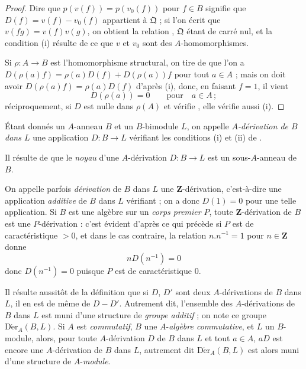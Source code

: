 \begin{proof}
Dire que $p(v(f))=p(v_0(f))$ pour $f\in B$ signifie que
$D(f)=v(f)-v_0(f)$ appartient à $\mathfrak{Q}$ ; si l'on écrit que
$v(fg)=v(f)v(g)$, on obtient la relation ,
$\mathfrak{Q}$ étant de carré nul, et la condition (i) résulte de ce que $v$
et $v_0$ sont des $A$-homomorphismes.

Si $\rho:A\to B$ est l'homomorphisme structural, on tire de
 que l'on a
$D(\rho(a)f)=\rho(a)D(f)+D(\rho(a))f$ pour tout $a\in A$ ; mais on doit
avoir $D(\rho(a)f)=\rho(a)D(f)$ d'après (i), donc, en faisant $f=1$, il
vient
\[
  D(\rho(a))=0 \qquad\text{pour}\quad a\in A\,;
\]
réciproquement, si $D$ est nulle dans $\rho(A)$ et vérifie
, elle vérifie aussi (i).
\end{proof}

\begin{definition}[20.1.2]
\label{0.20.1.2-fr}
Étant donnés un $A$-anneau $B$ et un $B$-bimodule $L$, on appelle
\emph{$A$-dérivation de $B$ dans $L$} une application $D:B\to L$ vérifiant
les conditions (i) et (ii) de .
\end{definition}

Il résulte de  que le \emph{noyau} d'une $A$-dérivation
$D:B\to L$ est un sous-$A$-anneau de $B$.

On appelle parfois \emph{dérivation} de $B$ dans $L$ une
$\mathbf{Z}$-dérivation, c'est-à-dire une application \emph{additive} de $B$
dans $L$ vérifiant  ; on a donc $D(1)=0$ pour une telle
application. Si $B$ est une algèbre sur un \emph{corps premier} $P$, toute
$\mathbf{Z}$-dérivation de $B$ est une $P$-dérivation : c'est évident d'après
ce qui précède si $P$ est de caractéristique $>0$, et dans le cas contraire,
la relation $n.n^{-1}=1$ pour $n\in\mathbf{Z}$ donne
\[
  nD(n^{-1})=0
\]
donc $D(n^{-1})=0$ puisque $P$ est de caractéristique $0$.

Il résulte aussitôt de la définition  que si $D$, $D'$ sont
deux $A$-dérivations de $B$ dans $L$, il en est de même de $D-D'$. Autrement
dit, l'ensemble des $A$-dérivations de $B$ dans $L$ est muni d'une structure
de \emph{groupe additif} ; on note ce groupe
$\operatorname{D\acute{e}r}_A(B,L)$. Si $A$ est \emph{commutatif}, $B$ une
$A$-\emph{algèbre commutative}, et $L$ un $B$-module, alors, pour toute
$A$-dérivation $D$ de $B$ dans $L$ et tout $a\in A$, $aD$ est encore une
$A$-dérivation de $B$ dans $L$, autrement dit $\operatorname{D\acute{e}r}_A(B,L)$
est alors muni d'une structure de $A$-\emph{module}.

